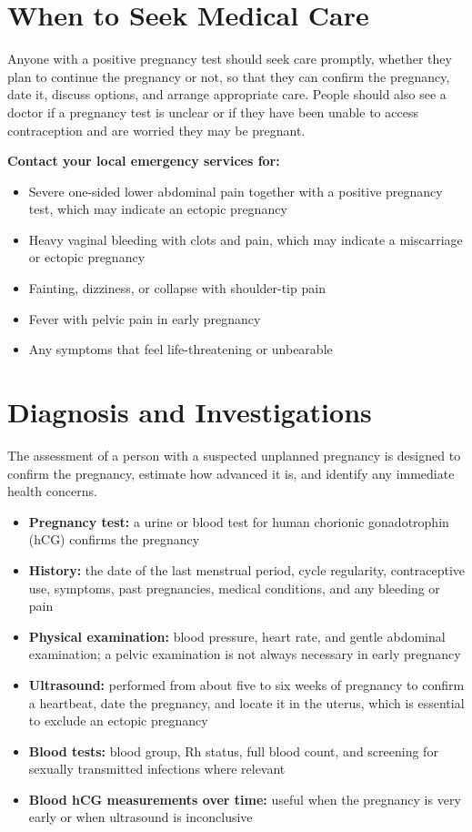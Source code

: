 \section*{When to Seek Medical Care}
Anyone with a positive pregnancy test should seek care promptly, whether they plan to continue the pregnancy or not, so that they can confirm the pregnancy, date it, discuss options, and arrange appropriate care. People should also see a doctor if a pregnancy test is unclear or if they have been unable to access contraception and are worried they may be pregnant.

\textbf{Contact your local emergency services for:}
\begin{itemize}
    \item Severe one-sided lower abdominal pain together with a positive pregnancy test, which may indicate an ectopic pregnancy
    \item Heavy vaginal bleeding with clots and pain, which may indicate a miscarriage or ectopic pregnancy
    \item Fainting, dizziness, or collapse with shoulder-tip pain
    \item Fever with pelvic pain in early pregnancy
    \item Any symptoms that feel life-threatening or unbearable
\end{itemize}

\section*{Diagnosis and Investigations}
The assessment of a person with a suspected unplanned pregnancy is designed to confirm the pregnancy, estimate how advanced it is, and identify any immediate health concerns.

\begin{itemize}
    \item \textbf{Pregnancy test:} a urine or blood test for human chorionic gonadotrophin (hCG) confirms the pregnancy
    \item \textbf{History:} the date of the last menstrual period, cycle regularity, contraceptive use, symptoms, past pregnancies, medical conditions, and any bleeding or pain
    \item \textbf{Physical examination:} blood pressure, heart rate, and gentle abdominal examination; a pelvic examination is not always necessary in early pregnancy
    \item \textbf{Ultrasound:} performed from about five to six weeks of pregnancy to confirm a heartbeat, date the pregnancy, and locate it in the uterus, which is essential to exclude an ectopic pregnancy
    \item \textbf{Blood tests:} blood group, Rh status, full blood count, and screening for sexually transmitted infections where relevant
    \item \textbf{Blood hCG measurements over time:} useful when the pregnancy is very early or when ultrasound is inconclusive
\end{itemize}

